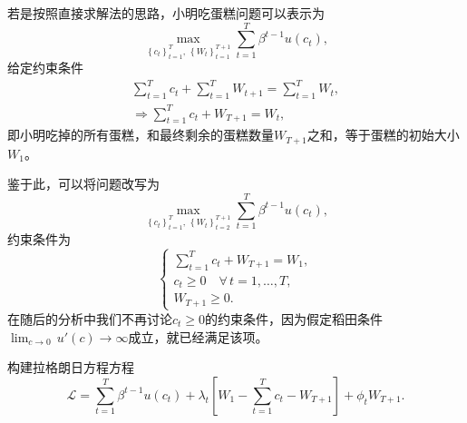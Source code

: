 若是按照直接求解法的思路，小明吃蛋糕问题可以表示为
\begin{equation*}
  \max_{
  \left\{c_{t}\right\}_{t=1}^{T}, \,
  \left\{W_{t}\right\}_{t=1}^{T+1}
  }
  \sum_{t=1}^{T} \beta^{t-1} u \left( c_{t} \right),
\end{equation*}
给定约束条件
\begin{equation*}
  \begin{split}
    \sum_{t=1}^{T} c_{t} + \sum_{t=1}^{T} W_{t+1} = \sum_{t=1}^{T} W_{t}, \\
    \Rightarrow \sum_{t=1}^{T} c_{t} + W_{T+1} = W_{t},
  \end{split}
\end{equation*}
即小明吃掉的所有蛋糕，和最终剩余的蛋糕数量$W_{T+1}$之和，等于蛋糕的初始大小$W_{1}$。

鉴于此，可以将问题改写为
\begin{equation}
  \label{eq:dp-cake-direct-problem}
  \max_{
  \left\{c_{t}\right\}_{t=1}^{T}, \,
  \left\{W_{t}\right\}_{t=2}^{T+1}
  }
  \sum_{t=1}^{T} \beta^{t-1} u \left( c_{t} \right),
\end{equation}
约束条件为
\begin{equation}
  \label{eq:dp-cake-direct-constraint}
  \begin{cases}
    \sum_{t=1}^{T} c_{t} + W_{T+1} = W_{1}, \\
    c_{t} \ge 0 \quad \forall \, t = 1,\ldots,T,\\
    W_{T+1} \ge 0.
  \end{cases}
\end{equation}
在随后的分析中我们不再讨论$c_{t} \ge 0$的约束条件，因为假定稻田条件$\lim_{c \rightarrow 0} \, u'(c) \rightarrow \infty$成立，就已经满足该项。

构建拉格朗日方程方程
\begin{equation*}
  \mathcal{L} = \sum_{t=1}^{T} \beta^{t-1} u \left( c_{t} \right) + \lambda_{t}
  \left[
    W_{1} - \sum_{t=1}^{T} c_{t} - W_{T+1}
  \right]
  + \phi_{t} W_{T+1}.
\end{equation*}

